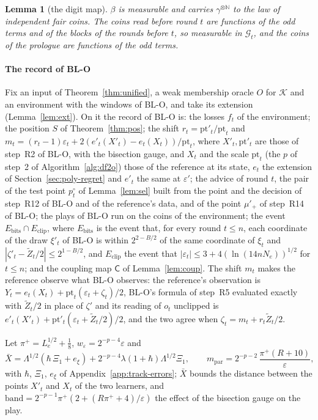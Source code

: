\documentclass[11pt]{amsart}
\newtheorem{lemma}[theorem]{Lemma}
\theoremstyle{definition}
\numberwithin{equation}{section}
\newcommand{\cK}{\mathcal{K}}
\newcommand{\cG}{\mathscr{G}}
\begin{document}
\begin{lemma}[the digit map]\label{lem:digit}
$\beta$ is measurable and carries $\gamma^{\otimes\mathbb N}$ to the law of independent fair coins. The coins read before round $t$ are functions of the odd terms and of the blocks of the rounds before $t$, so measurable in $\cG_t$, and the coins of the prologue are functions of the odd terms.
\end{lemma}

\paragraph{The record of BL-O} Fix an input of Theorem~\ref{thm:unified}, a weak membership oracle $O$ for $\cK$ and an environment with the windows of BL-O, and take its extension (Lemma~\ref{lem:ext}). On it the record of BL-O is: the losses $f_t$ of the environment; the position $S$ of Theorem~\ref{thm:pos}; the shift $r_t=\mathrm{pt}'_t/\mathrm{pt}_t$ and $m_t=(r_t-1)\varepsilon_t+2(e'_t(X'_t)-e_t(X_t))/\mathrm{pt}_t$, where $X'_t,\mathrm{pt}'_t$ are those of step~R2 of BL-O, with the bisection gauge, and $X_t$ and the scale $\mathrm{pt}_t$ (the $p$ of step~2 of Algorithm~\ref{alg:df2o}) those of the reference at its state, $e_t$ the extension of Section~\ref{sec:poly-regret} and $e'_t$ the same at $\varepsilon'$; the advice of round $t$, the pair of the test point $p^\circ_t$ of Lemma~\ref{lem:sel} built from the point and the decision of step~R12 of BL-O and of the reference's data, and of the point $\mu'_+$ of step~R14 of BL-O; the plays of BL-O run on the coins of the environment; the event $E_{\mathrm{bits}}\cap E_{\mathrm{clip}}$, where $E_{\mathrm{bits}}$ is the event that, for every round $t\le n$, each coordinate of the draw $\xi'_t$ of BL-O is within $2^{2-B/2}$ of the same coordinate of $\xi_t$ and $|\zeta'_t-\tilde Z_t/2|\le2^{1-B/2}$, and $E_{\mathrm{clip}}$ the event that $|\varepsilon_t|\le3+4(\ln(14nN_e))^{1/2}$ for $t\le n$; and the coupling map $\mathsf C$ of Lemma~\ref{lem:coup}. The shift $m_t$ makes the reference observe what BL-O observes: the reference's observation is $Y_t=e_t(X_t)+\mathrm{pt}_t(\varepsilon_t+\zeta_t)/2$, BL-O's formula of step~R5 evaluated exactly with $\tilde Z_t/2$ in place of $\zeta'$ and its reading of $o_t$ unclipped is $e'_t(X'_t)+\mathrm{pt}'_t(\varepsilon_t+\tilde Z_t/2)/2$, and the two agree when $\zeta_t=m_t+r_t\tilde Z_t/2$.

Let $\pi^+=L_e^{1/2}+\frac18$, $w_\varepsilon=2^{-p-4}\varepsilon$ and
\[
\bar X=\Lambda^{1/2}(\hbar\,\Xi_1+e_\xi)+2^{-p-4}\lambda(1+\hbar)\Lambda^{1/2}\Xi_1,\qquad m_{\mathrm{par}}=2^{-p-2}\,\frac{\pi^+(R+10)}\varepsilon,
\]
with $\hbar$, $\Xi_1$, $e_\xi$ of Appendix~\ref{app:track-errors}; $\bar X$ bounds the distance between the points $X'_t$ and $X_t$ of the two learners, and $\mathrm{band}=2^{-p-1}\pi^+(2+(R\pi^++4)/\varepsilon)$ the effect of the bisection gauge on the play.
\end{document}

